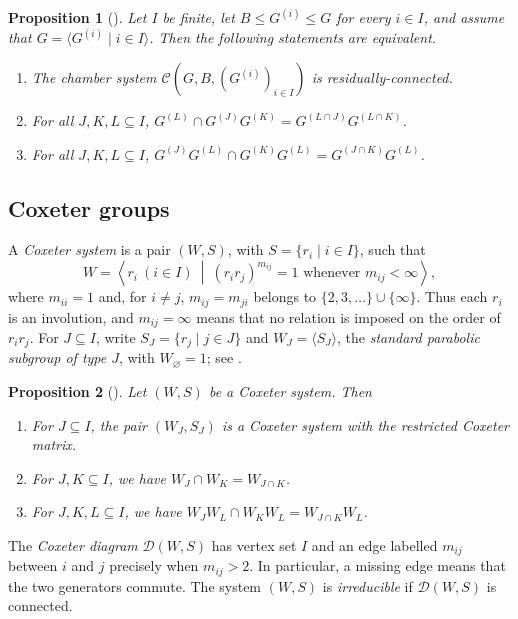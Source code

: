 \documentclass[11pt,letterpaper]{amsart}
\newtheorem{prop}{Proposition}[section]
\newcommand{\DD}{\mathcal{D}}
\newcommand{\CC}{\mathcal{C}}
\begin{document}
\begin{prop}[{\cite[Theorem~3.6.9]{buekenhout2013diagram}}]
\label{prop:RC_CosetChamberSystem}
Let $I$ be finite, let $B\leq G^{(i)}\leq G$ for every $i\in I$, and assume
that $G=\langle G^{(i)}\mid i\in I\rangle$.  Then the following statements
are equivalent.
\begin{enumerate}
    \item The chamber system $\CC(G,B,(G^{(i)})_{i\in I})$ is residually-connected.
    \item For all $J,K,L\subseteq I$,
    $G^{(L)}\cap G^{(J)}G^{(K)}=G^{(L\cap J)}G^{(L\cap K)}$.
    \item For all $J,K,L\subseteq I$,
    $G^{(J)}G^{(L)}\cap G^{(K)}G^{(L)}=G^{(J\cap K)}G^{(L)}$.
\end{enumerate}
\end{prop}

\subsection{Coxeter groups}

A \emph{Coxeter system} is a pair $(W,S)$, with $S=\{r_i\mid i\in I\}$,
such that
\[
    W=\left\langle r_i\ (i\in I)\ \middle|\
       (r_ir_j)^{m_{ij}}=1\text{ whenever }m_{ij}<\infty\right\rangle,
\]
where $m_{ii}=1$ and, for $i\neq j$, $m_{ij}=m_{ji}$ belongs to
$\{2,3,\ldots\}\cup\{\infty\}$.  Thus each $r_i$ is an involution, and
$m_{ij}=\infty$ means that no relation is imposed on the order of $r_ir_j$.  For
$J\subseteq I$, write $S_J=\{r_j\mid j\in J\}$ and
$W_J=\langle S_J\rangle$, the \emph{standard parabolic subgroup of type
$J$}, with $W_\varnothing=1$; see \cite[Chapter~IV, Section~1]{Bourbaki2006}.

\begin{prop}[{\cite[Chapter~IV, Section~1, Theorem~2 and Exercise~1(b)]{Bourbaki2006}}]
\label{prop:CoxeterProperties}
Let $(W,S)$ be a Coxeter system.  Then
\begin{enumerate}
    \item For $J\subseteq I$, the pair $(W_J,S_J)$ is a Coxeter system
    with the restricted Coxeter matrix.
    \item For $J,K\subseteq I$, we have $W_J\cap W_K=W_{J\cap K}$.
    \item For $J,K,L\subseteq I$, we have
    $W_JW_L\cap W_KW_L=W_{J\cap K}W_L$.
\end{enumerate}
\end{prop}

The \emph{Coxeter diagram} $\DD(W,S)$ has vertex set $I$ and an edge
labelled $m_{ij}$ between $i$ and $j$ precisely when $m_{ij}>2$. In particular, a missing edge means that the
two generators commute.  The system $(W,S)$ is \emph{irreducible} if
$\DD(W,S)$ is connected.
\end{document}
